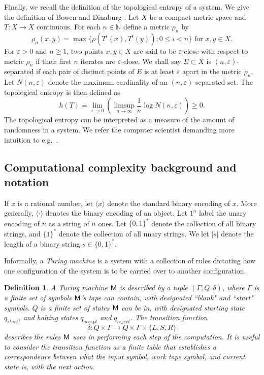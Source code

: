 \documentclass{amsart}
\theoremstyle{theorem}
\newtheorem{definition}[theorem]{Definition}
\theoremstyle{remark}
\numberwithin{equation}{section}
\newcommand{\NN}{\mathbb{N}}
\newcommand{\ccM}{\textsf{\upshape M}}
\begin{document}
Finally, we recall the definition of the topological entropy of a system. We give the definition of Bowen and Dinaburg \cite{bowen1971entropy,dinaburg1970correlation}.
Let $X$ be a compact metric space and $T:X\rightarrow X$ continuous.
For each $n \in \NN$ define a metric $\rho_n$ by
\[
\rho_n(x, y) = \max\{\rho(T^i(x),T^i(y)): 0\leq i < n\} \text{ for } x, y \in X.
\]
For $\varepsilon > 0$ and $n \geq 1$, two points $x, y \in X$ are said to be $\varepsilon$-close with respect to metric $\rho_n$ if their first $n$ iterates are $\varepsilon$-close.
We shall say $E \subset X$ is $(n, \varepsilon)$-separated if each pair of distinct points of $E$ is at least $\varepsilon$ apart in the metric $\rho_n$. Let $N(n,\varepsilon)$ denote the maximum cardinality of an $(n,\varepsilon)$-separated set.
The topological entropy is then defined as
\[
h(T) = \lim_{\varepsilon\rightarrow 0}\left(\limsup_{n\rightarrow \infty}\frac{1}{n} \log N(n,\varepsilon)\right) \geq 0.
\]
The topological entropy can be interpreted as a measure of the amount of randomness in a system. We refer the computer scientist demanding more intuition to e.g.\ \cite{walters2000introduction}.

\subsection{Computational complexity background and notation}

If $x$ is a rational number, let $\langle x \rangle$ denote the standard binary encoding of $x$. More generally, $\langle \cdot \rangle$ denotes the binary encoding of an object. Let $1^n$ label the unary encoding of $n$ as a string of $n$ ones. Let $\{0,1\}^*$ denote the collection of all binary strings, and $\{1\}^*$ denote the collection of all unary strings. We let $|s|$ denote the length of a binary string $s \in \{0,1\}^*$. 

Informally, a \emph{Turing machine} is a system with a collection of rules dictating how one configuration of the system is to be carried over to another configuration.

\begin{definition}
A \emph{Turing machine $\ccM$} is described by a tuple $(\Gamma, Q, \delta)$, where $\Gamma$ is a finite set of symbols $\ccM$'s tape can contain, with designated ``blank" and ``start" symbols. $Q$ is a finite set of states $\ccM$ can be in, with designated starting state $q_{start}$, and halting states $q_{accept}$ and $q_{reject}$. The transition function \[\delta:Q \times \Gamma \rightarrow Q \times \Gamma \times \{L, S, R\}\] describes the rules $\ccM$ uses in performing each step of the computation. It is useful to consider the transition function as a \emph{finite} table that establishes a correspondence between what the input symbol, work tape symbol, and current state is, with the next action.
\end{definition}
\end{document}
